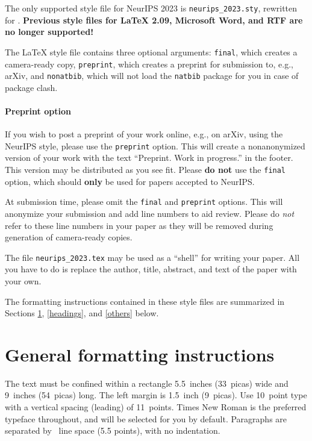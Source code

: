 \documentclass{article}
\begin{document}
The only supported style file for NeurIPS 2023 is \verb+neurips_2023.sty+,
rewritten for \LaTeXe{}.  \textbf{Previous style files for \LaTeX{} 2.09,
  Microsoft Word, and RTF are no longer supported!}


The \LaTeX{} style file contains three optional arguments: \verb+final+, which
creates a camera-ready copy, \verb+preprint+, which creates a preprint for
submission to, e.g., arXiv, and \verb+nonatbib+, which will not load the
\verb+natbib+ package for you in case of package clash.


\paragraph{Preprint option}
If you wish to post a preprint of your work online, e.g., on arXiv, using the
NeurIPS style, please use the \verb+preprint+ option. This will create a
nonanonymized version of your work with the text ``Preprint. Work in progress.''
in the footer. This version may be distributed as you see fit. Please \textbf{do
  not} use the \verb+final+ option, which should \textbf{only} be used for
papers accepted to NeurIPS.


At submission time, please omit the \verb+final+ and \verb+preprint+
options. This will anonymize your submission and add line numbers to aid
review. Please do \emph{not} refer to these line numbers in your paper as they
will be removed during generation of camera-ready copies.


The file \verb+neurips_2023.tex+ may be used as a ``shell'' for writing your
paper. All you have to do is replace the author, title, abstract, and text of
the paper with your own.


The formatting instructions contained in these style files are summarized in
Sections \ref{gen_inst}, \ref{headings}, and \ref{others} below.


\section{General formatting instructions}
\label{gen_inst}


The text must be confined within a rectangle 5.5~inches (33~picas) wide and
9~inches (54~picas) long. The left margin is 1.5~inch (9~picas).  Use 10~point
type with a vertical spacing (leading) of 11~points.  Times New Roman is the
preferred typeface throughout, and will be selected for you by default.
Paragraphs are separated by ~line space (5.5 points), with no
indentation.
\end{document}
